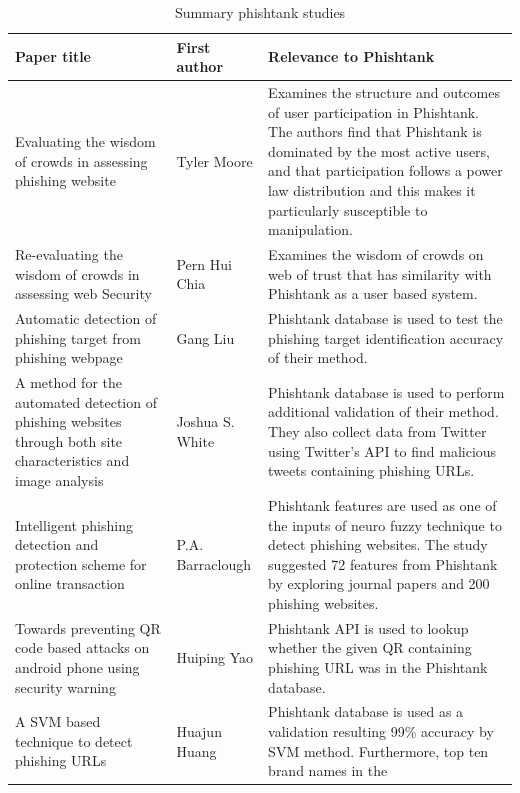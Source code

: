 \begin{longtable}{>{\raggedright}p{3cm}>{\raggedright}p{2cm}>{\raggedright}p{5cm}}
\caption{\label{tab:phishtank}Summary phishtank studies}
\tabularnewline
\toprule 
\textbf{\footnotesize{}Paper title} & \textbf{\footnotesize{}First author} & \textbf{\footnotesize{}Relevance to Phishtank}\tabularnewline
\midrule 
{\scriptsize{}Evaluating the wisdom of crowds in assessing phishing
website \citep{moore:2008}} & {\scriptsize{}Tyler Moore} & {\scriptsize{}Examines the structure and outcomes of user participation
in Phishtank. The authors find that Phishtank is dominated by the
most active users, and that participation follows a power law distribution
and this makes it particularly susceptible to manipulation.}\tabularnewline
\midrule 
{\scriptsize{}Re-evaluating the wisdom of crowds in assessing web
Security \citep{chia:2012}} & {\scriptsize{}Pern Hui Chia} & {\scriptsize{}Examines the wisdom of crowds on web of trust that has
similarity with Phishtank as a user based system.}\tabularnewline
\midrule 
{\scriptsize{}Automatic detection of phishing target from phishing
webpage \citep{liu:2010}} & {\scriptsize{}Gang Liu} & {\scriptsize{}Phishtank database is used to test the phishing target
identification accuracy of their method.}\tabularnewline
\midrule 
{\scriptsize{}A method for the automated detection of phishing websites
through both site characteristics and image analysis \citep{white:2012}} & {\scriptsize{}Joshua S. White} & {\scriptsize{}Phishtank database is used to perform additional validation
of their method. They also collect data from Twitter using Twitter\textquoteright s
API to find malicious tweets containing phishing URLs.}\tabularnewline
\midrule 
{\scriptsize{}Intelligent phishing detection and protection scheme
for online transaction \citep{barraclough:2013}} & {\scriptsize{}P.A. Barraclough} & {\scriptsize{}Phishtank features are used as one of the inputs of
neuro fuzzy technique to detect phishing websites. The study suggested
72 features from Phishtank by exploring journal papers and 200 phishing
websites.}\tabularnewline
\midrule 
{\scriptsize{}Towards preventing QR code based attacks on android
phone using security warning \citep{yao:2013}} & {\scriptsize{}Huiping Yao} & {\scriptsize{}Phishtank API is used to lookup whether the given QR
containing phishing URL was in the Phishtank database.}\tabularnewline
\midrule 
{\scriptsize{}A SVM based technique to detect phishing URLs \citep{huang:2012}} & {\scriptsize{}Huajun Huang} & {\scriptsize{}Phishtank database is used as a validation resulting
99\% accuracy by SVM method. Furthermore, top ten brand names in the
}
\end{longtable}
